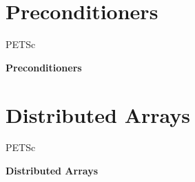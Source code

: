 




%
% 

\section{Preconditioners}
\begin{frame}{PETSc}
   \begin{center} \Large \textbf{Preconditioners} \end{center}
\end{frame}



%










%
%


\section{Distributed Arrays}
\begin{frame}{PETSc}
   \begin{center} \Large \textbf{Distributed Arrays} \end{center}
\end{frame}


